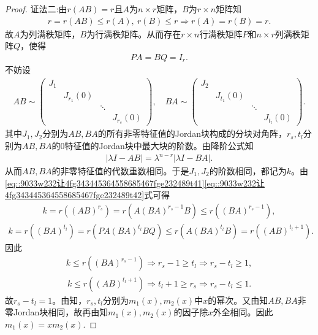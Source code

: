 \documentclass[../../main.tex]{subfiles}
\begin{document}
\begin{proof}
{\color{blue}证法二:}由$r(AB) = r$且$A$为$n \times r$矩阵，$B$为$r \times n$矩阵知
\begin{align*}
r = r(AB) \leqslant r(A),\ r(B) \leqslant r \Longrightarrow r(A) = r(B) = r.
\end{align*}
故$A$为列满秩矩阵，$B$为行满秩矩阵。从而存在$r \times n$行满秩矩阵$P$和$n \times r$列满秩矩阵$Q$，使得
\begin{align}
PA = BQ = I_r. \label{eq::9033w232让4fg343445364558685467fge232489t41}
\end{align}
不妨设
\begin{align}
AB \sim \begin{pmatrix}
J_1 & & & \\
& J_{r_1}(0) & & \\
& & \ddots & \\
& & & J_{r_s}(0)
\end{pmatrix},\quad BA \sim \begin{pmatrix}
J_2 & & & \\
& J_{t_1}(0) & & \\
& & \ddots & \\
& & & J_{t_l}(0)
\end{pmatrix}. \label{eq::9033w232让4fg343445364558685467fge232489t42}
\end{align}
其中$J_1,J_2$分别为$AB,BA$的所有非零特征值的Jordan块构成的分块对角阵，$r_s,t_l$分别为$AB,BA$的$0$特征值的Jordan块中最大块的阶数。由降阶公式知
\begin{align*}
\left| \lambda I - AB \right| = \lambda^{n - r} \left| \lambda I - BA \right|.
\end{align*}
从而$AB,BA$的非零特征值的代数重数相同。于是$J_1,J_2$的阶数相同，都记为$k$。由\eqref{eq::9033w232让4fg343445364558685467fge232489t41}\eqref{eq::9033w232让4fg343445364558685467fge232489t42}式可得
\begin{align*}
k = r\left( \left( AB \right)^{r_s} \right) = r\left( A\left( BA \right)^{r_s - 1}B \right) \leqslant r\left( \left( BA \right)^{r_s - 1} \right),
\end{align*}
\begin{align*}
k = r\left( \left( BA \right)^{t_l} \right) = r\left( PA\left( BA \right)^{t_l}BQ \right) \leqslant r\left( A\left( BA \right)^{t_l}B \right) = r\left( \left( AB \right)^{t_l + 1} \right).
\end{align*}
因此
\begin{align*}
k \leqslant r\left( \left( BA \right)^{r_s - 1} \right) \Longrightarrow r_s - 1 \geqslant t_l \Longrightarrow r_s - t_l \geqslant 1,
\end{align*}
\begin{align*}
k \leqslant r\left( \left( AB \right)^{t_l + 1} \right) \Longrightarrow t_l + 1 \geqslant r_s \Longrightarrow r_s - t_l \leqslant 1.
\end{align*}
故$r_s - t_l = 1$。由知，$r_s,t_l$分别为$m_1(x),m_2(x)$中$x$的幂次。又由知$AB,BA$非零Jordan块相同，故再由知$m_1(x),m_2(x)$的因子除$x$外全相同。因此$m_1(x) = xm_2(x)$.

\end{proof}
\end{document}
